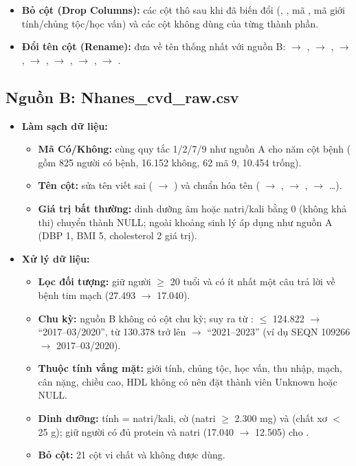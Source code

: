 \begin{itemize}
\begin{itemize}
\item \textbf{Bỏ cột (Drop Columns):} các cột thô sau khi đã biến đổi (, , mã , mã giới tính/chủng tộc/học vấn) và các cột không dùng của từng thành phần.
\item \textbf{Đổi tên cột (Rename):} đưa về tên thống nhất với nguồn B:  $\rightarrow$ ,  $\rightarrow$ ,  $\rightarrow$ ,  $\rightarrow$ ,  $\rightarrow$ ,  $\rightarrow$ ,  $\rightarrow$ .
\end{itemize}
\end{itemize}

\subsection{Nguồn B: Nhanes\_cvd\_raw.csv}
\begin{itemize}
\item \textbf{Làm sạch dữ liệu:}
\begin{itemize}
\item \textbf{Mã Có/Không:} cùng quy tắc 1/2/7/9 như nguồn A cho năm cột bệnh ( gồm 825 người có bệnh, 16.152 không, 62 mã 9, 10.454 trống).
\item \textbf{Tên cột:} sửa tên viết sai ( $\rightarrow$ ) và chuẩn hóa tên ( $\rightarrow$ ,  $\rightarrow$ ,  $\rightarrow$ \ldots).
\item \textbf{Giá trị bất thường:} dinh dưỡng âm hoặc natri/kali bằng 0 (không khả thi) chuyển thành NULL; ngoài khoảng sinh lý áp dụng như nguồn A (DBP 1, BMI 5, cholesterol 2 giá trị).
\end{itemize}
\item \textbf{Xử lý dữ liệu:}
\begin{itemize}
\item \textbf{Lọc đối tượng:} giữ người $\geq$ 20 tuổi và có ít nhất một câu trả lời về bệnh tim mạch (27.493 $\rightarrow$ 17.040).
\item \textbf{Chu kỳ:} nguồn B không có cột chu kỳ; suy ra từ : $\leq$ 124.822 $\rightarrow$ ``2017--03/2020'', từ 130.378 trở lên $\rightarrow$ ``2021--2023'' (ví dụ SEQN 109266 $\rightarrow$ 2017--03/2020).
\item \textbf{Thuộc tính vắng mặt:} giới tính, chủng tộc, học vấn, thu nhập, mạch, cân nặng, chiều cao, HDL không có nên đặt thành viên Unknown hoặc NULL.
\item \textbf{Dinh dưỡng:} tính  = natri/kali, cờ  (natri $\geq$ 2.300 mg) và  (chất xơ $<$ 25 g); giữ người có đủ protein và natri (17.040 $\rightarrow$ 12.505) cho .
\item \textbf{Bỏ cột:} 21 cột vi chất và  không được dùng.
\end{itemize}
\end{itemize}


